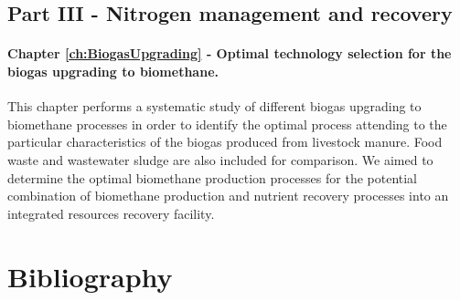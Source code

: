 \begin{refsection}[referencesCh1]
\subsection{Part III - Nitrogen management and recovery}
\paragraph{Chapter \ref{ch:BiogasUpgrading} - Optimal technology selection for the biogas upgrading to biomethane.} This chapter performs a systematic study of different biogas upgrading to biomethane processes in order to identify the optimal process attending to the particular characteristics of the biogas produced from livestock manure. Food waste and wastewater sludge are also included for comparison. We aimed to determine the optimal biomethane production processes for the potential combination of biomethane production and nutrient recovery processes into an integrated resources recovery facility.

\section*{Bibliography}

\printbibliography[heading=none]
\end{refsection}